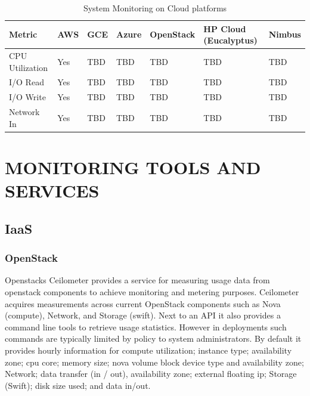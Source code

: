 \documentclass{sig-alternate-05-2015}
\begin{document}
\begin{table}[htb]
\caption{System Monitoring on Cloud platforms}
\begin{scriptsize}
\label{T:SMmetrics}
\bigskip
\begin{center}
\begin{tabular}{p{}p{}p{}p{}p{}p{}p{}}
Metric & AWS & GCE & Azure & OpenStack & HP Cloud (Eucalyptus) & Nimbus \\
\hline
CPU Utilization & Yes & TBD & TBD & TBD & TBD & TBD \\
\hline
I/O Read & Yes & TBD & TBD & TBD & TBD & TBD \\
\hline
I/O Write & Yes & TBD & TBD & TBD & TBD & TBD \\
\hline
Network In & Yes & TBD & TBD & TBD & TBD & TBD \\
\hline
\end{tabular}
\end{center}
\end{scriptsize}
\end{table}

\section{MONITORING TOOLS AND SERVICES}\label{S:tools}

\subsection{IaaS}

\subsubsection{OpenStack}


Openstacks Ceilometer provides a service for measuring usage data from
openstack components to achieve monitoring and metering
purposes. Ceilometer acquires measurements across current OpenStack
components such as Nova (compute), Network, and Storage (swift). Next
to an API it also provides a command line tools to retrieve usage
statistics. However in deployments such commands are typically limited
by policy to system administrators. By default it provides hourly
information for compute utilization; instance type; availability zone;
cpu core; memory size; nova volume block device type and availability
zone; Network; data transfer (in / out), availability zone; external
floating ip; Storage (Swift); disk size used; and data in/out.
\end{document}
